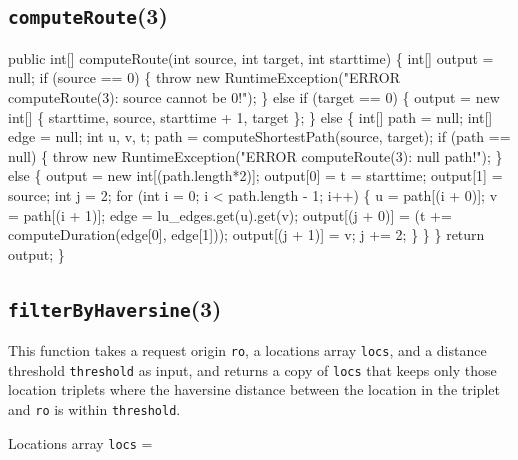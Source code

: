 \documentclass{article}
\def\nwendcode{\endtrivlist \endgroup}      %
\let\nwdocspar=\par
\begin{document}
\subsection{{\tt{}\protect{}computeRoute}(3)}
\nwenddocs{}\endmoddef{}
public int[] computeRoute(int source, int target, int starttime) \{
  int[] output = null;
  if (source == 0) \{
    throw new RuntimeException("ERROR computeRoute(3): source cannot be 0!");
  \} else if (target == 0) \{
    output = new int[] \{ starttime, source, starttime + 1, target \};
  \} else \{
    int[] path = null;
    int[] edge = null;
    int u, v, t;
    path = computeShortestPath(source, target);
    if (path == null) \{
      throw new RuntimeException("ERROR computeRoute(3): null path!");
    \} else \{
      output = new int[(path.length*2)];
      output[0] = t = starttime;
      output[1] = source;
      int j = 2;
      for (int i = 0; i < path.length - 1; i++) \{
        u = path[(i + 0)];
        v = path[(i + 1)];
        edge = lu_edges.get(u).get(v);
        output[(j + 0)] = (t += computeDuration(edge[0], edge[1]));
        output[(j + 1)] = v;
        j += 2;
      \}
    \}
  \}
  return output;
\}
\eatline
{}\nwendcode{}\nwdocspar
\subsection{{\tt{}\protect{}filterByHaversine}(3)}
This function takes a request origin {\tt{}ro}, a locations array {\tt{}locs}, and
a distance threshold {\tt{}threshold} as input, and returns a copy of {\tt{}locs}
that keeps only those location triplets where the haversine distance between
the location in the triplet and {\tt{}ro} is within {\tt{}threshold}.

Locations array {\tt{}locs} =
\end{document}
